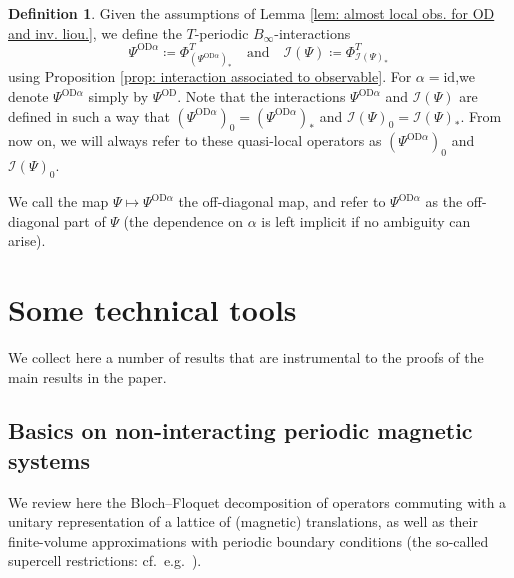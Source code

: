 \documentclass[a4paper]{article}
\renewcommand{\Phi}{\varPhi}
\renewcommand{\Psi}{\varPsi}
\newcommand{\OD}[1][]{   ^{\mathrm{OD}#1}   }
\theoremstyle{plain}
\theoremstyle{definition}
\newtheorem{definition}[theorem]{Definition}
\theoremstyle{remark}
\renewcommand{\(}{\left(}
\renewcommand{\)}{\right)}
\begin{document}
 


 
\begin{definition}\label{def:off-diagonal}
Given the assumptions of Lemma \ref{lem: almost local obs. for OD and inv. liou.}, we define the $T$-periodic $B_\infty$-interactions
    \begin{equation}\label{dfn:XjOD}
    \Psi\OD[\alpha] \coloneq \Phi_{(\Psi\OD[\alpha])_*}^T\quad\mbox{and}\quad \mathcal{I}(\Psi) \coloneq \Phi_{\mathcal{I}(\Psi)_*}^T\,
    \end{equation}
using Proposition \ref{prop: interaction associated to observable}.
For $\alpha=\mathrm{id}$,we denote $\Psi\OD[\alpha]$ simply by $\Psi\OD$.
Note that the interactions $\Psi\OD[\alpha]$ and $\mathcal{I}(\Psi)$ are defined in such a way that ${(\Psi\OD[\alpha])_0} = {(\Psi\OD[\alpha])_*}$ and $\mathcal{I}(\Psi)_0 = \mathcal{I}(\Psi)_*$. From now on, we will always refer to these quasi-local operators as ${(\Psi\OD[\alpha])_0} $ and $\mathcal{I}(\Psi)_0$.
\end{definition}

\medskip

We call the map $\Psi\mapsto  \Psi\OD[\alpha]$ the off-diagonal map, and  refer to $\Psi\OD[\alpha]$ as the off-diagonal part of $\Psi$ (the dependence on $\alpha$ is left implicit if no ambiguity can arise).



 

\section{Some technical tools} \label{appendix_technical}

We collect here a number of results that are instrumental to the proofs of the main results in the paper.

\subsection{Basics on non-interacting periodic magnetic systems}\label{app:BF}

 



We review here the Bloch--Floquet decomposition of operators commuting with a unitary representation of a lattice of (magnetic) translations, as well as their finite-volume approximations with periodic boundary conditions (the so-called supercell restrictions: cf.\ e.g.~\cite[Sec.~4]{gontier2016convergence}).
\end{document}
